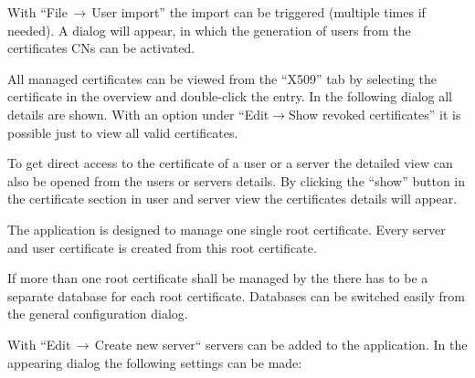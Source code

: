 %
%


\nl With ``File$\,\rightarrow\,$User import'' the import can be triggered
(multiple times if needed). A dialog will appear, in which the generation of
users from the certificates CNs can be activated.


\nl All managed certificates can be viewed from the ``X509'' tab by
selecting the certificate in the overview and double-click the entry. In
the following dialog all details are shown. With an option under
 ``Edit$\rightarrow$Show revoked certificates'' it is possible just to view
 all valid certificates.

\nl To get direct access to the certificate of a user or a server the
detailed view can also be opened from the users or servers details.  By
clicking the ``show'' button in the certificate section in user and server
view the certificates details will appear.



\nl The application is designed to manage one single root certificate. Every
server
and user certificate is created from this root certificate.

\nl If more than one root certificate shall be managed by the \Nbm{} there
has to
be a separate database for each root certificate. Databases can be switched
easily from the general configuration dialog.


\nl With ``Edit$\,\rightarrow\,$Create new server`` servers can be added to
the application. In the appearing dialog the following settings can be made:

